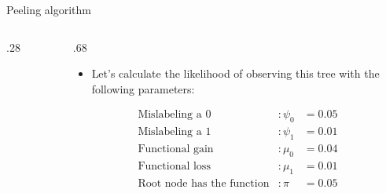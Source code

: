 \documentclass[9pt,ignorenonframetext,]{beamer}
\providecommand{\tightlist}{%
  \setlength{\itemsep}{0pt}\setlength{\parskip}{0pt}}
\newcommand{\includetikz}[2]{
\begin{figure}
\scalebox{#2}{

}
\end{figure}
}
\def\begincols{\begin{columns}[T]}
\def\begincol{\begin{column}[T]}
\def\endcol{\end{column}}
\def\endcols{\end{columns}}
\begin{document}
\begin{frame}[t]{Peeling algorithm}

\begincols

\begincol{.28\textwidth}

\includetikz{simple_tree.tex}{.6}

\endcol

\begincol{.68\textwidth}

\begin{itemize}
\tightlist
\item
  Let's calculate the likelihood of observing this tree with the
  following parameters:
\end{itemize}

\footnotesize

\normalsize

\[
\begin{aligned}
\mbox{Mislabeling a 0} &: \psi_0 &= 0.05 \\
\mbox{Mislabeling a 1} &:\psi_1 &= 0.01 \\
\mbox{Functional gain} &:\mu_0  &= 0.04  \\
\mbox{Functional loss} &:\mu_1  &= 0.01  \\
\mbox{Root node has the function} &: \pi    &= 0.05  \\
\end{aligned}
\]

\endcol

\endcols

\footnotesize

\normalsize

\end{frame}
\end{document}
